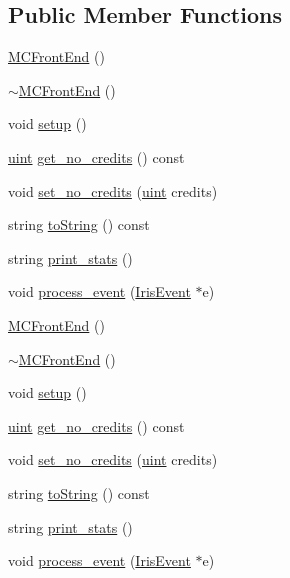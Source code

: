 \subsection*{Public Member Functions}
\begin{CompactItemize}
\item 
\hyperlink{classMCFrontEnd_26241509c8a72b46cf6ff3b843601b63}{MCFrontEnd} ()
\item 
\hyperlink{classMCFrontEnd_a6661a18919e7ef025ff32c955243b5d}{$\sim$MCFrontEnd} ()
\item 
void \hyperlink{classMCFrontEnd_5f399666cb967c146570e81372fe6be6}{setup} ()
\item 
\hyperlink{outputBuffer_8h_91ad9478d81a7aaf2593e8d9c3d06a14}{uint} \hyperlink{classMCFrontEnd_9db80e378e0c7255bf66d43e2350cc15}{get\_\-no\_\-credits} () const 
\item 
void \hyperlink{classMCFrontEnd_eb0cc4a818d1a8dd1cdc071da8519628}{set\_\-no\_\-credits} (\hyperlink{outputBuffer_8h_91ad9478d81a7aaf2593e8d9c3d06a14}{uint} credits)
\item 
string \hyperlink{classMCFrontEnd_9dda980a7ae732e6cb6da7121bc4f539}{toString} () const 
\item 
string \hyperlink{classMCFrontEnd_38750cc156a8b88225c58b1c08e4f83e}{print\_\-stats} ()
\item 
void \hyperlink{classMCFrontEnd_cc935494693a9b02addf8ea8c04f81b3}{process\_\-event} (\hyperlink{classIrisEvent}{IrisEvent} $\ast$e)
\item 
\hyperlink{classMCFrontEnd_26241509c8a72b46cf6ff3b843601b63}{MCFrontEnd} ()
\item 
\hyperlink{classMCFrontEnd_a6661a18919e7ef025ff32c955243b5d}{$\sim$MCFrontEnd} ()
\item 
void \hyperlink{classMCFrontEnd_5f399666cb967c146570e81372fe6be6}{setup} ()
\item 
\hyperlink{outputBuffer_8h_91ad9478d81a7aaf2593e8d9c3d06a14}{uint} \hyperlink{classMCFrontEnd_9db80e378e0c7255bf66d43e2350cc15}{get\_\-no\_\-credits} () const 
\item 
void \hyperlink{classMCFrontEnd_eb0cc4a818d1a8dd1cdc071da8519628}{set\_\-no\_\-credits} (\hyperlink{outputBuffer_8h_91ad9478d81a7aaf2593e8d9c3d06a14}{uint} credits)
\item 
string \hyperlink{classMCFrontEnd_9dda980a7ae732e6cb6da7121bc4f539}{toString} () const 
\item 
string \hyperlink{classMCFrontEnd_38750cc156a8b88225c58b1c08e4f83e}{print\_\-stats} ()
\item 
void \hyperlink{classMCFrontEnd_cc935494693a9b02addf8ea8c04f81b3}{process\_\-event} (\hyperlink{classIrisEvent}{IrisEvent} $\ast$e)
\end{CompactItemize}
